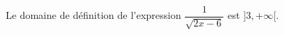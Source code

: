 Le domaine de définition de l'expression $\dfrac{1}{\sqrt{2x-6}}$ est $]3,+\infty[$.

\begin{reponses}
\end{reponses}

